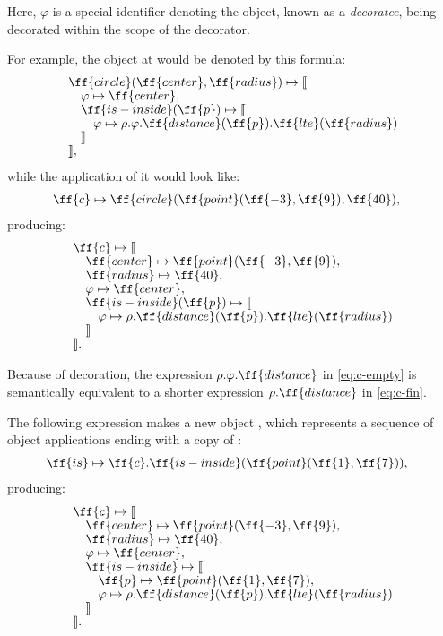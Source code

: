 Here, \(\varphi\) is a special identifier denoting the object,
known as a \emph{decoratee}, being decorated
within the scope of the decorator.

For example, the object at  would
be denoted by this formula:
\begin{equation}\label{eq:c-empty}
\begin{split}
& \ff{circle}(\ff{center}, \ff{radius}) \mapsto \llbracket \br
& \quad \varphi \mapsto \ff{center}, \br
& \quad \ff{is-inside}(\ff{p}) \mapsto \llbracket \br
& \quad \quad \varphi \mapsto \rho.\varphi.\ff{distance}(\ff{p}).\ff{lte}(\ff{radius}) \br
& \quad \rrbracket \br
& \rrbracket,
\end{split}
\end{equation}
while the application of it would look like:
\begin{equation}
\begin{split}
\ff{c} & \mapsto \ff{circle}(\ff{point}(\ff{-3}, \ff{9}), \ff{40}),
\end{split}
\end{equation}
producing:
\begin{equation}\label{eq:c-fin}
\begin{split}
& \ff{c} \mapsto \llbracket \br
& \quad \ff{center} \mapsto \ff{point}(\ff{-3}, \ff{9}), \br
& \quad \ff{radius} \mapsto \ff{40}, \br
& \quad \varphi \mapsto \ff{center}, \br
& \quad \ff{is-inside}(\ff{p}) \mapsto \llbracket \br
& \quad \quad \varphi \mapsto \rho.\ff{distance}(\ff{p}).\ff{lte}(\ff{radius}) \br
& \quad \rrbracket \br
& \rrbracket.
\end{split}
\end{equation}

Because of decoration, the expression
\(\rho.\varphi.\ff{distance}\) in \cref{eq:c-empty} is semantically equivalent to a shorter expression
\(\rho.\ff{distance}\) in \cref{eq:c-fin}.

The following expression makes a new object , which represents
a sequence of object applications ending with a copy of :
\begin{equation}\label{eq:is}
\begin{split}
& \ff{is} \mapsto \ff{c}.\ff{is-inside}(\ff{point}(\ff{1}, \ff{7})),
\end{split}
\end{equation}
producing:
\begin{equation}\label{eq:c-fin2}
\begin{split}
& \ff{c} \mapsto \llbracket \br
& \quad \ff{center} \mapsto \ff{point}(\ff{-3}, \ff{9}), \br
& \quad \ff{radius} \mapsto \ff{40}, \br
& \quad \varphi \mapsto \ff{center}, \br
& \quad \ff{is-inside} \mapsto \llbracket \br
& \quad \quad \ff{p} \mapsto \ff{point}(\ff{1}, \ff{7}), \br
& \quad \quad \varphi \mapsto \rho.\ff{distance}(\ff{p}).\ff{lte}(\ff{radius}) \br
& \quad \rrbracket \br
& \rrbracket.
\end{split}
\end{equation}


